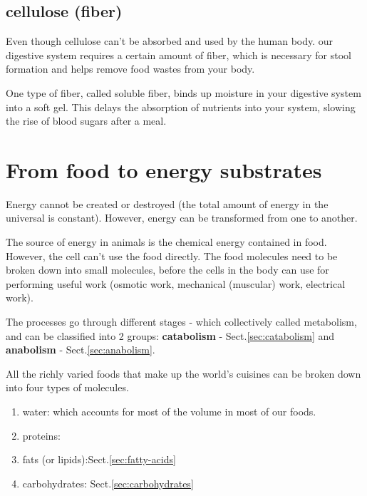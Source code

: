 \subsection{cellulose (fiber)}
\label{sec:cellulose}

Even though cellulose can't be absorbed and used by the human body.
our digestive system requires a certain amount of fiber, which is necessary for
stool formation and helps remove food wastes from your body.


One type of fiber, called soluble fiber, binds up moisture in your digestive
system into a soft gel. This delays the absorption of nutrients into your
system, slowing the rise of blood sugars after a meal.



\section{From food to energy substrates}
\label{sec:food}

\begin{framed}
  Energy cannot be created or destroyed (the total amount of energy in
  the universal is constant). However, energy can be transformed from
  one to another.

  The source of energy in animals is the chemical energy contained in food.
  However, the cell can't use the food directly. The food molecules need to be
  broken down into small molecules, before the cells in the body can use for
  performing useful work (osmotic work, mechanical (muscular) work, electrical
  work).

  The processes go through different stages - which collectively called
  metabolism, and can be classified into 2 groups: {\bf catabolism} -
  Sect.\ref{sec:catabolism} and {\bf anabolism} - Sect.\ref{sec:anabolism}.
  
\end{framed}

All the richly varied foods that make up the world's cuisines can be broken down
into four types of molecules.
\begin{enumerate}
  \item water: which accounts for most of the volume in most of our foods. 
  
  \item proteins:
  
  \item fats (or lipids):Sect.\ref{sec:fatty-acids}
  
  \item carbohydrates: Sect.\ref{sec:carbohydrates}
\end{enumerate}


